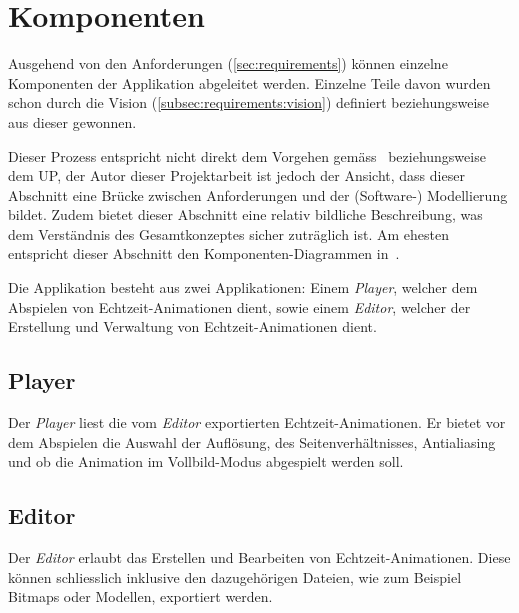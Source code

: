 
\section{Komponenten}
\label{sec:main-components}

Ausgehend von den Anforderungen (\ref{sec:requirements}) können einzelne
Komponenten der Applikation abgeleitet werden. Einzelne Teile davon wurden
schon durch die Vision (\ref{subsec:requirements:vision}) definiert
beziehungsweise aus dieser gewonnen.

Dieser Prozess entspricht nicht direkt dem Vorgehen
gemäss~\cite{larman_applying_2004} beziehungsweise dem UP, der Autor dieser
Projektarbeit ist jedoch der Ansicht, dass dieser Abschnitt eine Brücke
zwischen Anforderungen und der (Software-) Modellierung bildet. Zudem bietet
dieser Abschnitt eine relativ bildliche Beschreibung, was dem Verständnis des
Gesamtkonzeptes sicher zuträglich ist. Am ehesten entspricht dieser Abschnitt
den Komponenten-Diagrammen in~\cite[S. 653 bis 654]{larman_applying_2004}.

Die Applikation besteht aus zwei Applikationen: Einem \textit{Player},
welcher dem Abspielen von Echtzeit-Animationen dient, sowie einem \textit{Editor},
welcher der Erstellung und Verwaltung von Echtzeit-Animationen dient.

\subsection{Player}
\label{subsec:main-components:player}

Der \textit{Player} liest die vom \textit{Editor} exportierten
Echtzeit-Animationen. Er bietet vor dem Abspielen die Auswahl der Auflösung,
des Seitenverhältnisses, Antialiasing und ob die Animation im Vollbild-Modus
abgespielt werden soll.

\subsection{Editor}
\label{subsec:main-components:editor}

Der \textit{Editor} erlaubt das Erstellen und Bearbeiten von
Echtzeit-Animationen. Diese können schliesslich inklusive den
dazugehörigen Dateien, wie zum Beispiel Bitmaps oder Modellen, exportiert
werden.

